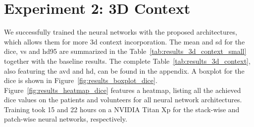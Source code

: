 \section{Experiment 2: 3D Context} \label{sec:exp_3dcontext} %
We successfully trained the neural networks with the proposed architectures, which allows them for more \gls{3d} context incorporation. The mean and \gls{sd} for the \acrlong{dice}, \acrlong{vs} and \acrlong{hd95} are summarized in the Table~\ref{tab:results_3d_context_small} together with the baseline results. The complete Table~\ref{tab:results_3d_context}, also featuring the \acrlong{avd} and \acrlong{hd}, can be found in the appendix. A boxplot for the \acrlong{dice} is shown in Figure~\ref{fig:results_boxplot_dice}. Figure~\ref{fig:results_heatmap_dice} features a heatmap, listing all the achieved \acrlong{dice} values on the patients and volunteers for all neural network architectures. Training took 15 and 22 hours on a NVIDIA Titan Xp for the stack-wise and patch-wise neural networks, respectively.

